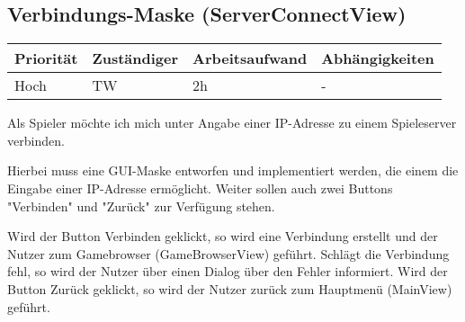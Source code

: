 \documentclass[a4paper]{scrreprt}
\newenvironment{requirement}[5] {
	\subsection{#1}
	\begin{tabularx}{\textwidth}{|X|l|X|X|}
		\hline
		Priorität & Zuständiger & Arbeitsaufwand & Abhängigkeiten \\
		\hline
		#2 & #3 & #4 & #5 \\
		\hline
	\end{tabularx}
	}{
	\newpage
	}
\begin{document}
\begin{requirement}{Verbindungs-Maske (ServerConnectView)}{Hoch}{TW}{2h}{-}

\begin{center}
	Als Spieler möchte ich mich unter Angabe einer IP-Adresse zu einem Spieleserver verbinden.
\end{center}

Hierbei muss eine GUI-Maske entworfen und implementiert werden, die einem die Eingabe einer IP-Adresse ermöglicht. Weiter sollen auch zwei Buttons "Verbinden" und "Zurück" zur Verfügung stehen.

Wird der Button \glqq Verbinden\grqq{} geklickt, so wird eine Verbindung erstellt und der Nutzer zum Gamebrowser (\glqq GameBrowserView\grqq{})  geführt. Schlägt die Verbindung fehl, so wird der Nutzer über einen Dialog über den Fehler informiert.
Wird der Button \glqq Zurück\grqq{} geklickt, so wird der Nutzer zurück zum Hauptmenü (\glqq MainView\grqq{}) geführt.

\end{requirement}
\end{document}
